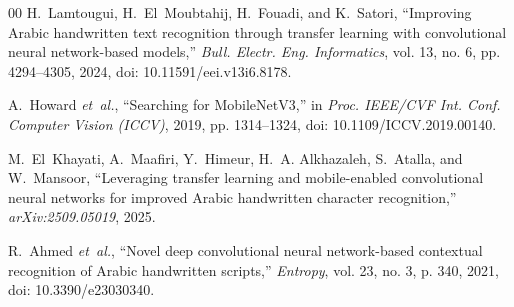 \documentclass[conference]{IEEEtran}
\begin{document}
\begin{thebibliography}{00}
H.~Lamtougui, H.~El~Moubtahij, H.~Fouadi, and K.~Satori, ``Improving Arabic handwritten text recognition through transfer learning with convolutional neural network-based models,'' \emph{Bull. Electr. Eng. Informatics}, vol. 13, no. 6, pp. 4294--4305, 2024, doi: 10.11591/eei.v13i6.8178.

A.~Howard \emph{et~al.}, ``Searching for MobileNetV3,'' in \emph{Proc. IEEE/CVF Int. Conf. Computer Vision (ICCV)}, 2019, pp. 1314--1324, doi: 10.1109/ICCV.2019.00140.

M.~El~Khayati, A.~Maafiri, Y.~Himeur, H.~A. Alkhazaleh, S.~Atalla, and W.~Mansoor, ``Leveraging transfer learning and mobile-enabled convolutional neural networks for improved Arabic handwritten character recognition,'' \emph{arXiv:2509.05019}, 2025.

R.~Ahmed \emph{et~al.}, ``Novel deep convolutional neural network-based contextual recognition of Arabic handwritten scripts,'' \emph{Entropy}, vol. 23, no. 3, p. 340, 2021, doi: 10.3390/e23030340.

\end{thebibliography}
\end{document}
